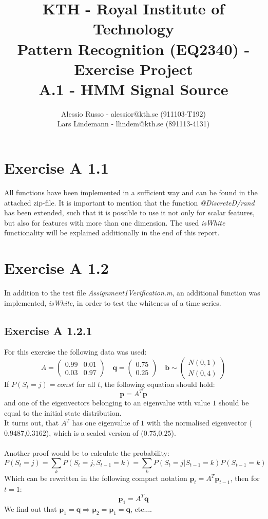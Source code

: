 \documentclass[10pt,a4paper,final]{article}
\author{Alessio Russo - alessior@kth.se (911103-T192) \\ Lars Lindemann - llindem@kth.se (891113-4131)}
\title{KTH - Royal Institute of Technology \\ \Large{Pattern Recognition (EQ2340) - Exercise Project }\\ A.1 - HMM Signal Source}
\begin{document}
\maketitle
\tableofcontents

\section{Exercise A 1.1}
All functions have been implemented in a sufficient way and can be found in the attached zip-file. It is important to mention that the function \textit{@DiscreteD/rand} has been extended, such that it is possible to use it not only for scalar features, but also for features with more than one dimension. The used \textit{isWhite} functionality will be explained additionally in the end of this report.
\newpage
\section{Exercise A 1.2}
In addition to the test file \textit{Assignment1Verification.m}, an additional function was implemented, \textit{isWhite}, in order to test the whiteness of a time series.
\subsection{Exercise A 1.2.1}
For this exercise the following data was used:
$$
A = 
 \begin{pmatrix}
  0.99 & 0.01 \\
  0.03 & 0.97
 \end{pmatrix} \quad
 \mathbf{q} = 
 \begin{pmatrix}
  0.75\\
  0.25
 \end{pmatrix} 
 \quad
 \mathbf{b} \sim
 \begin{pmatrix}
  \mathit{N}(0,1) \\
  \mathit{N}(0,4)
 \end{pmatrix} 
 $$
If $P(S_t=j)=const$ for all $t$, the following equation should hold:
$$\mathbf{p}=A^T \mathbf{p}$$
and one of the eigenvectors belonging to an eigenvalue with value $1$ should be equal to the initial state distribution. 
\\It turns out, that $A^T$ has one eigenvalue of $1$ with the normalised eigenvector ($0.9487$,$0.3162$), which is a scaled version of ($0.75$,$0.25$).
\\ \\
Another proof would be to calculate the probability:
$$P(S_t=j)=\sum_k P(S_t=j,S_{t-1}=k)=\sum_k P(S_t=j|S_{t-1}=k)P(S_{t-1}=k)$$
Which can be rewritten in the following compact notation $\mathbf{p}_t = A^T \mathbf{p}_{t-1}$, then for $t=1$:
$$\mathbf{p}_{1} = A^T \mathbf{q}$$
We find out that $\mathbf{p}_{1}= \mathbf{q} \Rightarrow \mathbf{p}_{2}=\mathbf{p}_{1}= \mathbf{q}$, etc....
\end{document}
